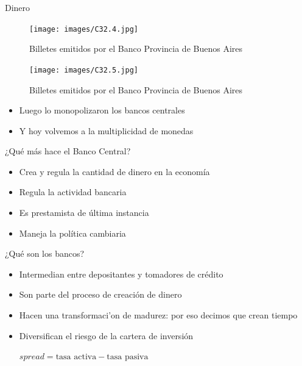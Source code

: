 \documentclass{beamer}
\begin{document}
\begin{frame}{Dinero }
        \begin{figure} [H]   
  \centering
  \texttt{[image: images/C32.4.jpg]}
      \caption{Billetes emitidos por el Banco Provincia de Buenos Aires}
  \label{fig:C32.4}
\end{figure}

\begin{figure} [H]   
\centering\texttt{[image: images/C32.5.jpg]}
\caption{Billetes emitidos por el Banco Provincia de Buenos Aires}
\end{figure}
       \begin{itemize}
           \item  Luego lo monopolizaron los bancos centrales
    \item Y hoy volvemos a la multiplicidad de monedas 
       \end{itemize}     
        \end{frame}
        

\begin{frame}{¿Qué más hace el Banco Central?}
    \begin{itemize}
    \item Crea y regula la cantidad de dinero en la economía 
    \item Regula la actividad bancaria
    \item Es prestamista de última instancia
    \item Maneja la política cambiaria 
    
\end{itemize}
\end{frame}

\begin{frame}{¿Qué son los bancos?}
    \begin{itemize}
    \item Intermedian entre depositantes y tomadores de crédito
    \item Son parte del proceso de creación de dinero
    \item Hacen una transformaci'on de madurez: por eso decimos que crean tiempo
    \item Diversifican el riesgo de la cartera de inversión
    \begin{center}
       $ spread = {\text{tasa activa}} - {\text{tasa pasiva}}  $
    \end{center}
     
    
\end{itemize}
\end{frame}
\end{document}
